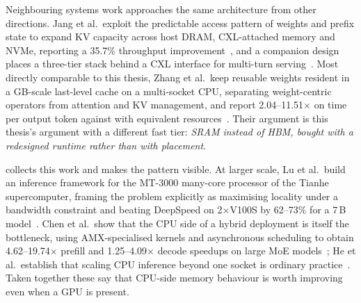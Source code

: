 Neighbouring systems work approaches the same architecture from other
directions.  Jang et al.\ exploit the predictable access pattern of
weights and prefix state to expand KV capacity across host DRAM,
CXL-attached memory and NVMe, reporting a 35.7\% throughput
improvement~\cite{jang2026itme}, and a companion design places a
three-tier stack behind a CXL interface for multi-turn
serving~\cite{jang2026hymcache}.  Most directly comparable to this
thesis, Zhang et al.\ keep reusable weights resident in a GB-scale
last-level cache on a multi-socket CPU, separating weight-centric
operators from attention and KV management, and report 2.04--11.51$\times$
on time per output token against \lcpp{} with equivalent
resources~\cite{zhang2026cacheresident}.  Their argument is this thesis's argument with a different fast tier:
\emph{SRAM instead of HBM, bought with a redesigned runtime rather than
with placement}.

 collects this work and makes the pattern
visible.  At larger scale, Lu et al.\ build an inference framework for
the MT-3000
many-core processor of the Tianhe supercomputer, framing the problem
explicitly as maximising locality under a bandwidth constraint and
beating DeepSpeed on 2$\times$V100S by 62--73\% for a 7\,B
model~\cite{lu2026thinfer}.  Chen et al.\ show that the CPU side of a
hybrid deployment is itself the bottleneck, using AMX-specialised
kernels and asynchronous scheduling to obtain 4.62--19.74$\times$
prefill and 1.25--4.09$\times$ decode speedups on large
MoE models~\cite{chen2025ktransformers}; He et al.\ establish that
scaling CPU inference beyond one socket is ordinary
practice~\cite{he2024distributedcpu}.  Taken together these say that
CPU-side memory behaviour is worth improving even when a GPU is
present.

